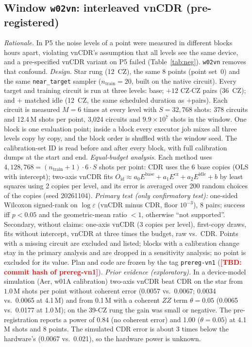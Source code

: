 \documentclass[conference]{IEEEtran}
\newcommand{\TBD}[1]{\textcolor{red}{\textbf{[TBD: #1]}}}
\newcommand{\Oid}{O_{\mathrm{id}}}
\newcommand{\arm}[1]{\texttt{#1}}
\begin{document}
\subsection{Window \texttt{w02vn}: interleaved vnCDR (pre-registered)}
\label{sec:w02vn-methods}
\emph{Rationale.} In P5 the noise levels of a point were measured in different blocks hours
apart, violating vnCDR's assumption that all levels see the same device, and a pre-specified
vnCDR variant on P5 failed (Table~\ref{tab:neg}). \texttt{w02vn} removes that confound.
\emph{Design.} Star rung (12~CZ), the same 8 points (point set~0) and the same
\arm{near\_target} sampler ($n_{\text{train}}=20$, built on the native circuit). Every target
and training circuit is run at three levels: base; $+12$ CZ$\cdot$CZ pairs (36~CZ); and $+$
matched idle (12~CZ, the same scheduled duration as $+$pairs). Each circuit is measured
$M=6$ times at every level with $S=32{,}768$ shots: 378 circuits and 12.4\,M shots per point,
3,024 circuits and $9.9\times10^7$ shots in the window. One block is one evaluation point;
inside a block every executor job mixes all three levels copy by copy, and the block order is
shuffled with the window seed. The calibration-set ID is read before and after every block,
with full calibration dumps at the start and end.
\emph{Equal-budget analysis.} Each method uses $4{,}128{,}768=(n_{\text{train}}+1)\cdot6\cdot S$
shots per point: CDR uses the 6 base copies (OLS with intercept); two-axis vnCDR fits
$\Oid\approx a_0E^{\text{base}}+a_1E^{\text{cz}}+a_2E^{\text{idle}}+b$ by least squares using 2
copies per level, and its error is averaged over 200 random choices of the copies (seed
20261104). \emph{Primary test (only confirmatory test):} one-sided Wilcoxon signed-rank on
$\log\varepsilon$ (vnCDR minus CDR, floor $10^{-3}$), 8 pairs; success iff $p<0.05$ and the
geometric-mean ratio $<1$, otherwise ``not supported''. Secondary, without claims: one-axis
vnCDR (3 copies per level), first-copy draws, fits without intercept, vnCDR at three times the
budget, raw vs.\ CDR. Points with a missing circuit are excluded and listed; blocks with a
calibration change stay in the primary analysis and are dropped in a sensitivity analysis; no
point is excluded for its value. Plan and code are frozen by the tag \texttt{prereg-vn1}
(\TBD{commit hash of prereg-vn1}). \emph{Prior evidence (exploratory).} In a device-model
simulation (Aer, w01A calibration) two-axis vnCDR beat CDR on the star from $1.0$\,M shots per
point without coherent error (0.0057 vs.\ 0.0067; 0.0034 vs.\ 0.0065 at 4.1\,M) and from
0.1\,M with a coherent $ZZ$ term $\theta=0.05$ (0.0065 vs.\ 0.0177 at 1.0\,M); on the 39-CZ rung
the gain was small or negative. The pre-registration reports a power of 0.84 (no coherent
error) and 1.00 ($\theta=0.05$) at 4.1\,M shots and 8 points. The simulated CDR error is about
3 times below the hardware's (0.0067 vs.\ 0.021), so the hardware power is unknown.
\end{document}
